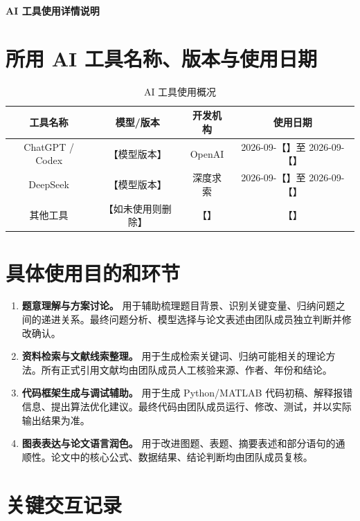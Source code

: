 \documentclass[a4paper]{ctexart}
\begin{document}
\begin{center}
  {\Large\bfseries AI 工具使用详情说明}
\end{center}

\section{所用 AI 工具名称、版本与使用日期}

\begin{table}[h]
  \centering
  \caption{AI 工具使用概况}
  \begin{tabular}{cccc}
    \toprule
    工具名称 & 模型/版本 & 开发机构 & 使用日期 \\
    \midrule
    ChatGPT / Codex & 【模型版本】 & OpenAI & 2026-09-【】至 2026-09-【】 \\
    DeepSeek & 【模型版本】 & 深度求索 & 2026-09-【】至 2026-09-【】 \\
    其他工具 & 【如未使用则删除】 & 【】 & 【】 \\
    \bottomrule
  \end{tabular}
\end{table}

\section{具体使用目的和环节}

\begin{enumerate}[label=\textbf{环节\arabic*：}, leftmargin=5em]
  \item \textbf{题意理解与方案讨论。}
  用于辅助梳理题目背景、识别关键变量、归纳问题之间的递进关系。最终问题分析、模型选择与论文表述由团队成员独立判断并修改确认。

  \item \textbf{资料检索与文献线索整理。}
  用于生成检索关键词、归纳可能相关的理论方法。所有正式引用文献均由团队成员人工核验来源、作者、年份和结论。

  \item \textbf{代码框架生成与调试辅助。}
  用于生成 Python/MATLAB 代码初稿、解释报错信息、提出算法优化建议。最终代码由团队成员运行、修改、测试，并以实际输出结果为准。

  \item \textbf{图表表达与论文语言润色。}
  用于改进图题、表题、摘要表述和部分语句的通顺性。论文中的核心公式、数据结果、结论判断均由团队成员复核。
\end{enumerate}

\section{关键交互记录}
\end{document}
